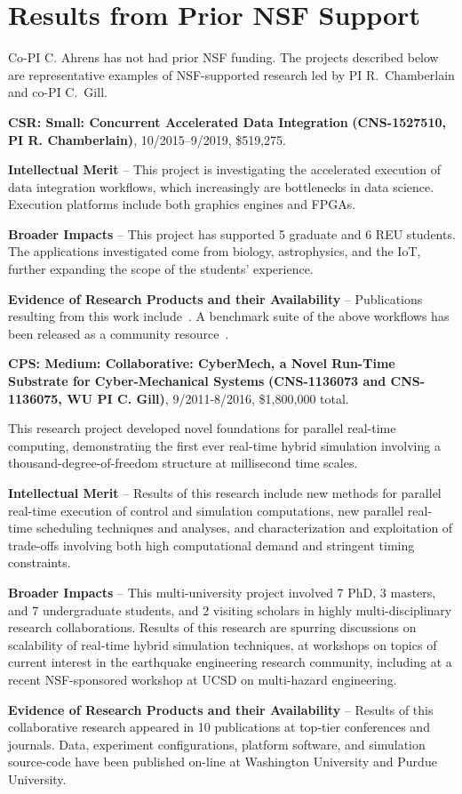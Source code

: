 \section{Results from Prior NSF Support}
\label{sec:prior}

Co-PI C. Ahrens has not had prior NSF funding. The projects described
below are representative examples of NSF-supported research led by PI 
R.~Chamberlain and co-PI C.~Gill.

\noindent
{\large\bf CSR: Small: Concurrent Accelerated Data Integration}
{\bf (CNS-1527510,
PI R. Chamberlain)}, 
10/2015--9/2019, \$519,275.  

\textbf{Intellectual Merit} -- This project is investigating the
accelerated execution of data integration workflows, which
increasingly are bottlenecks in data science. Execution platforms
include both graphics engines and FPGAs.

\textbf{Broader Impacts} -- This project has supported 5
graduate and 6 REU students.  The applications investigated
come from biology, astrophysics, and the IoT,
further expanding the scope of the students'
experience.

\textbf{Evidence of Research Products and their Availability} --
Publications resulting from this work include~\cite{cc19,dibs,c17,fcbmc19,mgc16,js16}.
A benchmark suite of the above workflows has been released
as a community resource~\cite{dibsv1}.

\noindent
{\large\bf CPS: Medium: Collaborative: CyberMech, a Novel Run-Time Substrate for 
Cyber-Mechanical Systems}
{\bf (CNS-1136073 and CNS-1136075,
WU PI C. Gill)}, 9/2011-8/2016, \$1,800,000 total.  

This research project developed novel foundations for parallel real-time computing, demonstrating the first ever real-time hybrid simulation involving a thousand-degree-of-freedom structure at millisecond time scales.

\textbf{Intellectual Merit} -- Results of this research include new methods for parallel real-time execution of control and simulation computations, new parallel real-time scheduling techniques and analyses, and characterization and exploitation of trade-offs involving both high computational demand and stringent timing constraints.

\textbf{Broader Impacts} -- This multi-university project involved 7 PhD, 3 masters, and 7 undergraduate students, and 2 visiting scholars in highly multi-disciplinary research collaborations.  Results of this research are spurring discussions on scalability of real-time hybrid simulation techniques, at workshops on topics of current interest in the earthquake engineering research community, including at a recent NSF-sponsored workshop at UCSD on multi-hazard engineering.

\textbf{Evidence of Research Products and their Availability} -- Results of this 
collaborative research appeared in 10 publications at top-tier conferences and journals.
Data, experiment configurations, platform software, and simulation source-code 
have been published on-line at Washington University and Purdue University.

